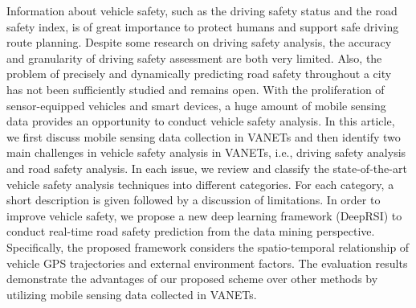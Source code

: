 \documentclass{article}
\begin{document}
\medskip
Information about vehicle safety, such as the driving safety status and the road safety index, is of great importance to protect humans and support safe driving route planning. Despite some research on driving safety analysis, the accuracy and granularity of driving safety assessment are both very limited. Also, the problem of precisely and dynamically predicting road safety throughout a city has not been sufficiently studied and remains open. With the proliferation of sensor-equipped vehicles and smart devices, a huge amount of mobile sensing data provides an opportunity to conduct vehicle safety analysis. In this article, we first discuss mobile sensing data collection in VANETs and then identify two main challenges in vehicle safety analysis in VANETs, i.e., driving safety analysis and road safety analysis. In each issue, we review and classify the state-of-the-art vehicle safety analysis techniques into different categories. For each category, a short description is given followed by a discussion of limitations. In order to improve vehicle safety, we propose a new deep learning framework (DeepRSI) to conduct real-time road safety prediction from the data mining perspective. Specifically, the proposed framework considers the spatio-temporal relationship of vehicle GPS trajectories and external environment factors. The evaluation results demonstrate the advantages of our proposed scheme over other methods by utilizing mobile sensing data collected in VANETs.

\printbibliography
\end{document}
